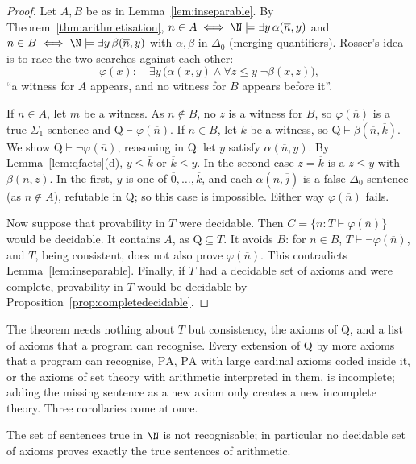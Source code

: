 \begin{proof}
Let $A,B$ be as in Lemma~\ref{lem:inseparable}. By Theorem~\ref{thm:arithmetisation}, $n\in A\iff\N\models\exists y\,\alpha(\overline n,y)$ and $n\in B\iff\N\models\exists y\,\beta(\overline n,y)$ with $\alpha,\beta$ in $\Delta_0$ (merging quantifiers). Rosser's idea is to race the two searches against each other:
\[
\varphi(x):\quad\exists y\,\bigl(\alpha(x,y)\land\forall z\le y\;\neg\beta(x,z)\bigr),
\]
``a witness for $A$ appears, and no witness for $B$ appears before it''.

If $n\in A$, let $m$ be a witness. As $n\notin B$, no $z$ is a witness for $B$, so $\varphi(\overline n)$ is a true $\Sigma_1$ sentence and $\mathrm Q\vdash\varphi(\overline n)$. If $n\in B$, let $k$ be a witness, so $\mathrm Q\vdash\beta(\overline n,\overline k)$. We show $\mathrm Q\vdash\neg\varphi(\overline n)$, reasoning in $\mathrm Q$: let $y$ satisfy $\alpha(\overline n,y)$. By Lemma~\ref{lem:qfacts}(d), $y\le\overline k$ or $\overline k\le y$. In the second case $z=\overline k$ is a $z\le y$ with $\beta(\overline n,z)$. In the first, $y$ is one of $\overline0,\dots,\overline k$, and each $\alpha(\overline n,\overline j)$ is a false $\Delta_0$ sentence (as $n\notin A$), refutable in $\mathrm Q$; so this case is impossible. Either way $\varphi(\overline n)$ fails.

Now suppose that provability in $T$ were decidable. Then $C=\{n:T\vdash\varphi(\overline n)\}$ would be decidable. It contains $A$, as $\mathrm Q\subseteq T$. It avoids $B$: for $n\in B$, $T\vdash\neg\varphi(\overline n)$, and $T$, being consistent, does not also prove $\varphi(\overline n)$. This contradicts Lemma~\ref{lem:inseparable}. Finally, if $T$ had a decidable set of axioms and were complete, provability in $T$ would be decidable by Proposition~\ref{prop:completedecidable}.
\end{proof}

The theorem needs nothing about $T$ but consistency, the axioms of $\mathrm Q$, and a list of axioms that a program can recognise. Every extension of $\mathrm Q$ by more axioms that a program can recognise, $\mathrm{PA}$, $\mathrm{PA}$ with large cardinal axioms coded inside it, or the axioms of set theory with arithmetic interpreted in them, is incomplete; adding the missing sentence as a new axiom only creates a new incomplete theory. Three corollaries come at once.

\begin{corollary}\label{cor:thn}
The set of sentences true in $\N$ is not recognisable; in particular no decidable set of axioms proves exactly the true sentences of arithmetic.
\end{corollary}

